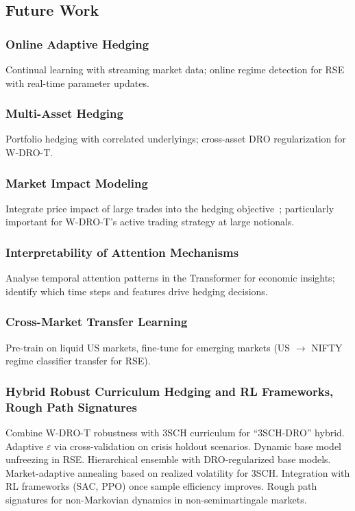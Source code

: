 \subsection{Future Work}
\label{sec:future}

\subsubsection{Online Adaptive Hedging}

Continual learning with streaming market data; online regime detection for RSE with real-time parameter updates.

\subsubsection{Multi-Asset Hedging}

Portfolio hedging with correlated underlyings; cross-asset DRO regularization for W-DRO-T.

\subsubsection{Market Impact Modeling}

Integrate price impact of large trades into the hedging objective~\citep{pickard2025rl}; particularly important for W-DRO-T's active trading strategy at large notionals.

\subsubsection{Interpretability of Attention Mechanisms}

Analyse temporal attention patterns in the Transformer for economic insights; identify which time steps and features drive hedging decisions.

\subsubsection{Cross-Market Transfer Learning}

Pre-train on liquid US markets, fine-tune for emerging markets (US $\to$ NIFTY regime classifier transfer for RSE).

\subsubsection{Hybrid Robust Curriculum Hedging and RL Frameworks, Rough Path Signatures}

Combine W-DRO-T robustness with 3SCH curriculum for ``3SCH-DRO'' hybrid. Adaptive $\varepsilon$ via cross-validation on crisis holdout scenarios. Dynamic base model unfreezing in RSE. Hierarchical ensemble with DRO-regularized base models. Market-adaptive annealing based on realized volatility for 3SCH. Integration with RL frameworks (SAC, PPO) once sample efficiency improves. Rough path signatures for non-Markovian dynamics in non-semimartingale markets.

